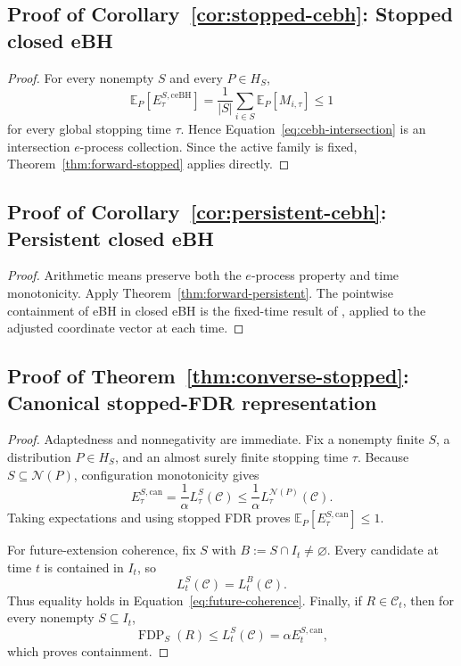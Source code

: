 \documentclass[11pt]{article}
\numberwithin{equation}{section}
\theoremstyle{plain}
\theoremstyle{definition}
\newcommand{\E}{\mathbb E}
\newcommand{\C}{\mathcal C}
\newcommand{\FDP}{\operatorname{FDP}}
\newcommand{\calN}{\mathcal N}
\newcommand{\loss}{L}
\newcommand{\can}{\mathrm{can}}
\newcommand{\ceBH}{\mathrm{ceBH}}
\begin{document}
\subsection{Proof of Corollary~\ref{cor:stopped-cebh}: Stopped closed eBH}\label{app:proof-stopped-cebh}

\begin{proof}
For every nonempty $S$ and every $P\in H_S$,
\[
  \E_P[E_\tau^{S,\ceBH}]
  =\frac1{|S|}\sum_{i\in S}\E_P[M_{i,\tau}]\leq1
\]
for every global stopping time $\tau$. Hence Equation~\eqref{eq:cebh-intersection} is an intersection $e$-process collection. Since the active family is fixed, Theorem~\ref{thm:forward-stopped} applies directly.
\end{proof}

\subsection{Proof of Corollary~\ref{cor:persistent-cebh}: Persistent closed eBH}\label{app:proof-persistent-cebh}

\begin{proof}
Arithmetic means preserve both the $e$-process property and time monotonicity. Apply Theorem~\ref{thm:forward-persistent}. The pointwise containment of eBH \citep{WangRamdas2022} in closed eBH is the fixed-time result of \citet{XuEtAl2026Closure}, applied to the adjusted coordinate vector at each time.
\end{proof}

\subsection{Proof of Theorem~\ref{thm:converse-stopped}: Canonical stopped-FDR representation}\label{app:proof-converse-stopped}

\begin{proof}
Adaptedness and nonnegativity are immediate. Fix a nonempty finite $S$, a distribution $P\in H_S$, and an almost surely finite stopping time $\tau$. Because $S\subseteq\calN(P)$, configuration monotonicity gives
\[
  E_\tau^{S,\can}
  =\frac1\alpha\loss_\tau^S(\C)
  \leq\frac1\alpha\loss_\tau^{\calN(P)}(\C).
\]
Taking expectations and using stopped FDR proves $\E_P[E_\tau^{S,\can}]\leq1$.

For future-extension coherence, fix $S$ with $B:=S\cap I_t\neq\varnothing$. Every candidate at time $t$ is contained in $I_t$, so
\[
  \loss_t^S(\C)=\loss_t^B(\C).
\]
Thus equality holds in Equation~\eqref{eq:future-coherence}. Finally, if $R\in\C_t$, then for every nonempty $S\subseteq I_t$,
\[
  \FDP_S(R)\leq\loss_t^S(\C)=\alpha E_t^{S,\can},
\]
which proves containment.
\end{proof}
\end{document}
